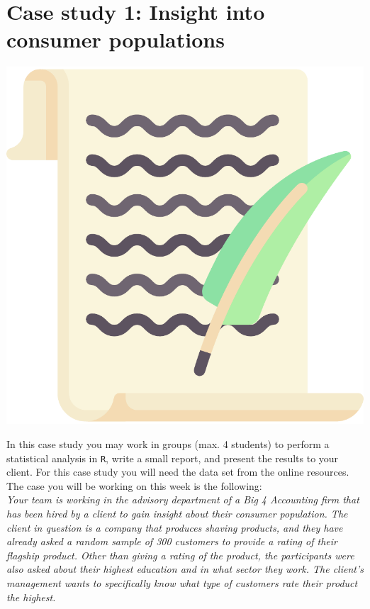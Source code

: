 
\begin{minipage}{0.8\textwidth}
\section{Case study 1: Insight into consumer populations}
\end{minipage}%
\hfill%
\begin{minipage}{0.1\textwidth}
\includegraphics[width=\linewidth]{Files/Images/lettericon.pdf}
\end{minipage}
\vspace*{.1cm}

In this case study you may work in groups (max. 4 students) to perform a statistical analysis in \texttt{R}, write a small report, and present the results to your client. For this case study you will need the data set  from the online resources. The case you will be working on this week is the following: \\

\textit{Your team is working in the advisory department of a Big 4 Accounting firm that has been hired by a client to gain insight about their consumer population. The client in question is a company that produces shaving products, and they have already asked a random sample of 300 customers to provide a rating of their flagship product. Other than giving a rating of the product, the participants were also asked about their highest education and in what sector they work. The client's management wants to specifically know what type of customers rate their product the highest.} \\

